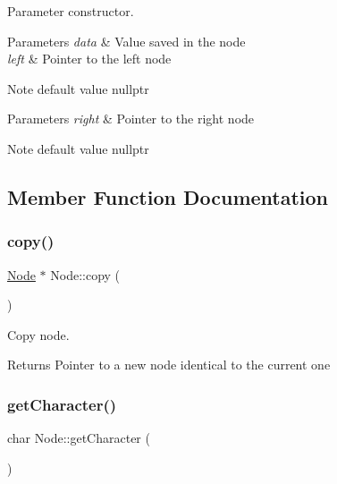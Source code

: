 Parameter constructor. 


\begin{DoxyParams}{Parameters}
{\em data} & Value saved in the node \\
\hline
{\em left} & Pointer to the left node \\
\hline
\end{DoxyParams}
\begin{DoxyNote}{Note}
default value nullptr 
\end{DoxyNote}

\begin{DoxyParams}{Parameters}
{\em right} & Pointer to the right node \\
\hline
\end{DoxyParams}
\begin{DoxyNote}{Note}
default value nullptr 
\end{DoxyNote}


\subsection{Member Function Documentation}
\mbox{\label{struct_node_a8557bfd8ff3979e326611dd919f1987d}} 
\subsubsection{\texorpdfstring{copy()}{copy()}}
{\footnotesize\ttfamily \mbox{\hyperlink{struct_node}{Node}} $\ast$ Node\+::copy (\begin{DoxyParamCaption}{ }\end{DoxyParamCaption})}



Copy node. 

\begin{DoxyReturn}{Returns}
Pointer to a new node identical to the current one 
\end{DoxyReturn}
\mbox{\label{struct_node_a5af2a6db15b8190ed18b7c608784f050}} 
\subsubsection{\texorpdfstring{getCharacter()}{getCharacter()}}
{\footnotesize\ttfamily char Node\+::get\+Character (\begin{DoxyParamCaption}{ }\end{DoxyParamCaption})}



